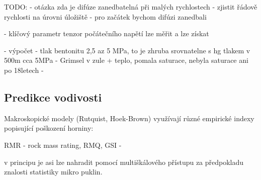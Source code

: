 \documentclass{article}
\begin{document}
TODO:
- otázka zda je difúze zanedbatelná při malých rychlostech
- zjistit řádově rychlosti na úrovni úložiště
- pro začátek bychom difúzi zanedbali

- klíčový parametr tenzor počátečního napětí
  lze měřit a lze získat 

- výpočet 
- tlak bentonitu 2,5 az 5 MPa, to je zhruba srovnatelne s hg tlakem v 500m cca 5MPa
- Grimsel v zule + teplo, pomala saturace, nebyla saturace ani po 18letech
- 

\subsection{Predikce vodivosti}
Makroskopické modely (Rutquist, Hoek-Brown) využívají různé empirické indexy popisující poškození horniny:

RMR - rock mass rating, RMQ, GSI -

v principu je asi lze nahradit pomocí multiškálového přístupu za předpokladu znalosti 
statistiky mikro puklin.
\end{document}
